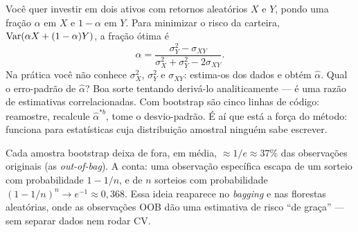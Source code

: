 \documentclass[11pt,a4paper]{article}
\begin{document}
\begin{exemplo}
Você quer investir em dois ativos com retornos aleatórios $X$ e $Y$, pondo uma
fração $\alpha$ em $X$ e $1-\alpha$ em $Y$. Para minimizar o risco da carteira,
$\operatorname{Var}(\alpha X+(1-\alpha)Y)$, a fração ótima é
\[
  \alpha = \frac{\sigma_Y^2-\sigma_{XY}}{\sigma_X^2+\sigma_Y^2-2\sigma_{XY}} .
\]
Na prática você não conhece $\sigma_X^2$, $\sigma_Y^2$ e $\sigma_{XY}$: estima-os
dos dados e obtém $\widehat\alpha$. Qual o erro-padrão de $\widehat\alpha$? Boa
sorte tentando derivá-lo analiticamente --- é uma razão de estimativas
correlacionadas. Com bootstrap são cinco linhas de código: reamostre, recalcule
$\widehat\alpha^{*b}$, tome o desvio-padrão. É aí que está a força do método:
funciona para estatísticas cuja distribuição amostral ninguém sabe escrever.
\end{exemplo}

\begin{observacao}
Cada amostra bootstrap deixa de fora, em média, $\approx 1/e \approx 37\%$ das
observações originais (as \emph{out-of-bag}). A conta: uma observação específica
escapa de um sorteio com probabilidade $1-1/n$, e de $n$ sorteios com probabilidade
$(1-1/n)^n \to e^{-1} \approx 0{,}368$. Essa ideia reaparece no \emph{bagging} e nas
florestas aleatórias, onde as observações OOB dão uma estimativa de risco
``de graça'' --- sem separar dados nem rodar CV.
\end{observacao}

\end{document}
